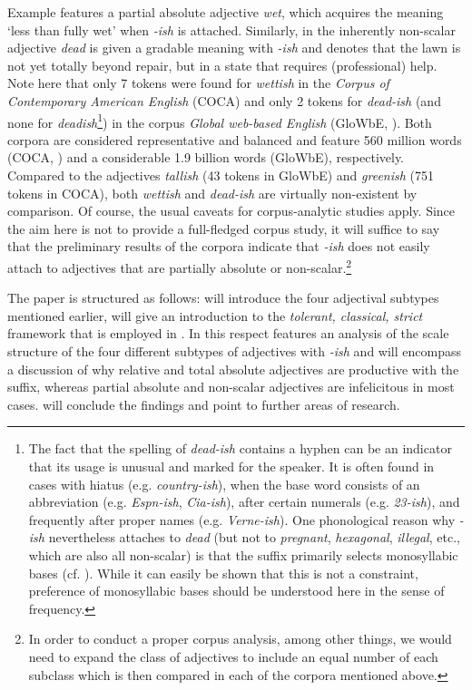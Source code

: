 \documentclass[output=paper]{langsci/langscibook}
\begin{document}
Example  features a partial absolute adjective  \textit{wet}, which acquires the meaning `less than fully wet' when \textit{-ish} is attached. Similarly, in  the inherently non-scalar adjective \textit{dead} is given a gradable meaning with \textit{-ish} and denotes that the lawn is not yet totally beyond repair, but in a state that requires (professional) help. Note here that only 7 tokens were found for \textit{wettish} in the \textit{Corpus of Contemporary American English} (COCA) and only 2 tokens for \textit{dead-ish} (and none for \textit{deadish}\footnote{The fact that the spelling of \textit{dead-ish} contains a hyphen can be an indicator that its usage is unusual and marked for the speaker. It is often found in cases with hiatus (e.g. \textit{country-ish}), when the base word consists of an abbreviation (e.g. \textit{Espn-ish}, \textit{Cia-ish}), after certain numerals (e.g. \textit{23-ish}), and frequently after proper names (e.g. \textit{Verne-ish}). One phonological reason why \textit{-ish} nevertheless attaches to \textit{dead} (but not to \textit{pregnant}, \textit{hexagonal}, \textit{illegal}, etc., which are also all non-scalar) is that the suffix primarily selects monosyllabic bases (cf. \citealt[235]{Dixon2014}). While it can easily be shown that this is not a constraint, preference of monosyllabic bases should be understood here in the sense of frequency.}) in the corpus \textit{Global web-based English} (GloWbE, \citealt{Davies2013}). Both corpora are considered representative and balanced and feature 560 million words (COCA, \citealt{Davies2008}) and a considerable 1.9 billion words (GloWbE), respectively. Compared to the adjectives \textit{tallish} (43 tokens in GloWbE) and \textit{greenish} (751 tokens in COCA), both \textit{wettish} and \textit{dead-ish} are virtually non-existent by comparison. Of course, the usual caveats for corpus-analytic studies apply. Since the aim here is not to provide a full-fledged corpus study, it will suffice to say that the preliminary results of the corpora indicate that \textit{-ish} does not easily attach to adjectives that are partially absolute or non-scalar.\footnote{In order to conduct a proper corpus analysis, among other things, we would need to expand the class of adjectives to include an equal number of each subclass which is then compared in each of the corpora mentioned above.}

The paper is structured as follows:  will introduce the four adjectival subtypes mentioned earlier,  will give an introduction to the \textit{tolerant, classical, strict} framework that is employed in \citet{Burnett2017}. In this respect  features an analysis of the scale structure of the four different subtypes of adjectives with \textit{-ish} and will encompass a discussion of why relative and total absolute adjectives are productive with the suffix, whereas partial absolute and non-scalar adjectives are infelicitous in most cases.  will conclude the findings and point to further areas of research.
\end{document}
